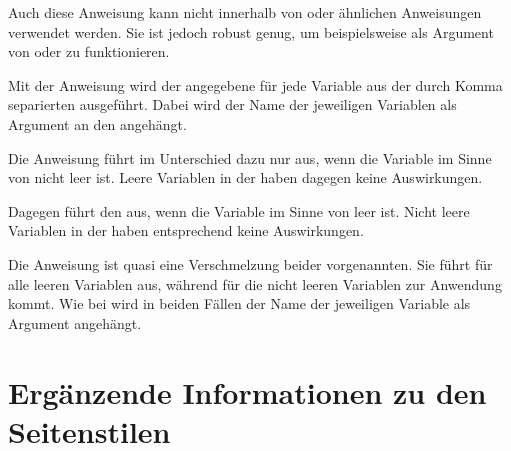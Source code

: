 Auch diese Anweisung kann nicht innerhalb von
 oder ähnlichen Anweisungen verwendet werden. Sie ist
jedoch robust genug, um beispielsweise als Argument von
 oder  zu
funktionieren.%
\EndIndexGroup


\begin{Declaration}
\end{Declaration}
Mit der Anweisung
 wird der angegebene  für jede Variable
aus der durch Komma separierten  ausgeführt. Dabei wird
der Name der jeweiligen Variablen als Argument an den 
angehängt.

Die Anweisung  führt im Unterschied dazu
 nur aus, wenn die Variable im Sinne von
 nicht leer ist. Leere Variablen in der
 haben dagegen keine Auswirkungen.

Dagegen führt  den  aus, wenn die
Variable im Sinne von  leer ist. Nicht
leere Variablen in der  haben entsprechend keine
Auswirkungen.

Die Anweisung  ist quasi eine Verschmelzung
beider vorgenannten. Sie führt  für alle leeren Variablen
aus, während  für die nicht leeren Variablen zur Anwendung
kommt. Wie bei  wird in beiden Fällen der Name der jeweiligen
Variable als Argument angehängt.%
\EndIndexGroup
%
\EndIndexGroup


\section{Ergänzende Informationen zu den Seitenstilen}
\BeginIndexGroup
{}

%
\EndIndexGroup

\iffalse%
